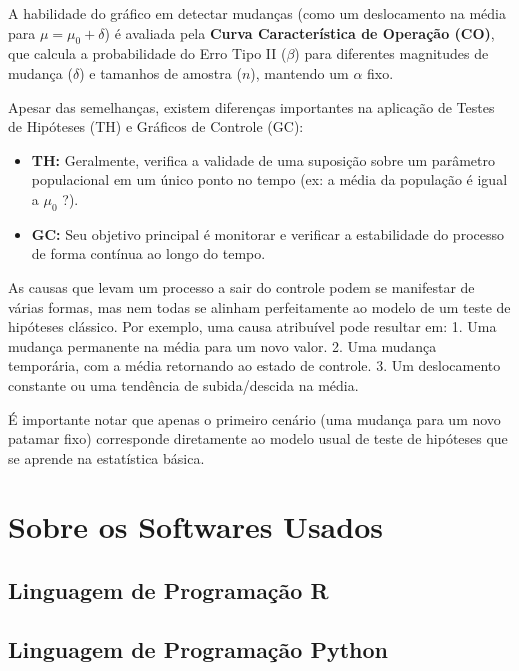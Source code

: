 \documentclass[
  portuguese,
  11pt,
  a4paper,
  DIV=11,
  numbers=noendperiod]{scrreprt}
\providecommand{\tightlist}{%
  \setlength{\itemsep}{0pt}\setlength{\parskip}{0pt}}
\begin{document}
A habilidade do gráfico em detectar mudanças (como um deslocamento na
média para \(\mu = \mu_0 + \delta\)) é avaliada pela \textbf{Curva
Característica de Operação (CO)}, que calcula a probabilidade do Erro
Tipo II (\(\beta\)) para diferentes magnitudes de mudança (\(\delta\)) e
tamanhos de amostra (\(n\)), mantendo um \(\alpha\) fixo.

Apesar das semelhanças, existem diferenças importantes na aplicação de
Testes de Hipóteses (TH) e Gráficos de Controle (GC):

\begin{itemize}
\tightlist
\item
  \textbf{TH:} Geralmente, verifica a validade de uma suposição sobre um
  parâmetro populacional em um único ponto no tempo (ex: a média da
  população é igual a \(\mu_0\) ?).
\item
  \textbf{GC:} Seu objetivo principal é monitorar e verificar a
  estabilidade do processo de forma contínua ao longo do tempo.
\end{itemize}

As causas que levam um processo a sair do controle podem se manifestar
de várias formas, mas nem todas se alinham perfeitamente ao modelo de um
teste de hipóteses clássico. Por exemplo, uma causa atribuível pode
resultar em: 1. Uma mudança permanente na média para um novo valor. 2.
Uma mudança temporária, com a média retornando ao estado de controle. 3.
Um deslocamento constante ou uma tendência de subida/descida na média.

É importante notar que apenas o primeiro cenário (uma mudança para um
novo patamar fixo) corresponde diretamente ao modelo usual de teste de
hipóteses que se aprende na estatística básica.

\section{Sobre os Softwares Usados}\label{sobre-os-softwares-usados}

\subsection{Linguagem de Programação
R}\label{linguagem-de-programauxe7uxe3o-r}

\subsection{Linguagem de Programação
Python}\label{linguagem-de-programauxe7uxe3o-python}
\end{document}
